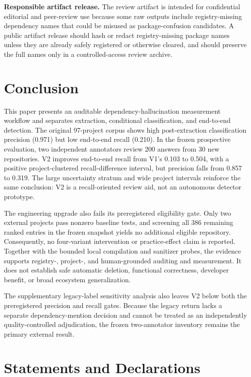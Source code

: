 \documentclass[pdflatex,sn-basic]{sn-jnl}
\begin{document}
\textbf{Responsible artifact release.} The review artifact is intended for confidential editorial and peer-review use because some raw outputs include registry-missing dependency names that could be misused as package-confusion candidates. A public artifact release should hash or redact registry-missing package names unless they are already safely registered or otherwise cleared, and should preserve the full names only in a controlled-access review archive.

\section{Conclusion}

This paper presents an auditable dependency-hallucination measurement workflow and separates extraction, conditional classification, and end-to-end detection. The original 97-project corpus shows high post-extraction classification precision (0.971) but low end-to-end recall (0.210). In the frozen prospective evaluation, two independent annotators review 200 answers from 30 new repositories. V2 improves end-to-end recall from V1's 0.103 to 0.504, with a positive project-clustered recall-difference interval, but precision falls from 0.857 to 0.319. The large uncertainty stratum and wide project intervals reinforce the same conclusion: V2 is a recall-oriented review aid, not an autonomous detector prototype.

The engineering upgrade also fails its preregistered eligibility gate. Only two external projects pass nonzero baseline tests, and screening all 386 remaining ranked entries in the frozen snapshot yields no additional eligible repository. Consequently, no four-variant intervention or practice-effect claim is reported. Together with the bounded local compilation and sanitizer probes, the evidence supports registry-, project-, and human-grounded auditing and measurement. It does not establish safe automatic deletion, functional correctness, developer benefit, or broad ecosystem generalization.

The supplementary legacy-label sensitivity analysis also leaves V2 below both the preregistered precision and recall gates. Because the legacy return lacks a separate dependency-mention decision and cannot be treated as an independently quality-controlled adjudication, the frozen two-annotator inventory remains the primary external result.

\section*{Statements and Declarations}
\end{document}
